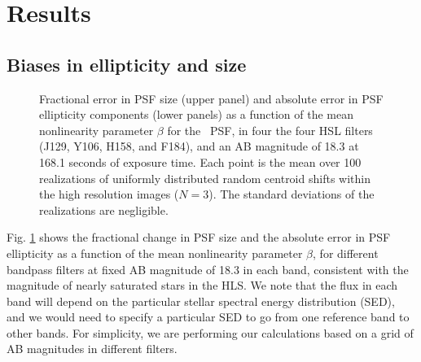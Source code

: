 \documentclass[11pt,preprint,flushrt]{aastex}
\begin{document}
\section{Results}
\label{results}
\subsection{Biases in ellipticity and size}

\begin{figure}[!h]
\centering
{}
\caption{Fractional error in PSF size (upper panel) and absolute error in PSF ellipticity components (lower panels) as a function of the mean nonlinearity parameter $\beta$ for the \wfa\ PSF, in four the four HSL filters (J129, Y106, H158, and F184), and an AB magnitude of 18.3 at 168.1 seconds of exposure time. 
Each point is the mean over 100 realizations of uniformly distributed random centroid shifts within the high resolution images ($N=3$).
The standard deviations of the realizations are negligible.}
\label{f2}
\end{figure}

Fig. \ref{f2} shows the fractional change in PSF size and the absolute error in PSF ellipticity as a function of the mean nonlinearity parameter $\beta$, for different bandpass filters at fixed AB magnitude of 18.3 in each band, consistent with the magnitude of nearly saturated stars in the HLS. We note that the flux in each band will depend on the particular stellar spectral energy distribution (SED), and we would need to specify a particular SED to go from one reference band to other bands. For simplicity, we are performing our calculations based on a grid of AB magnitudes in different filters. 
\end{document}
